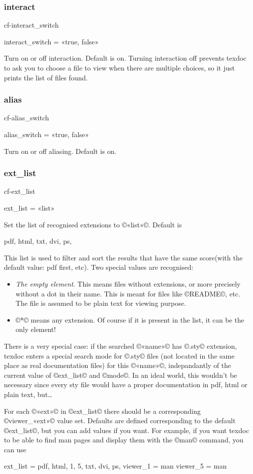 \documentclass[a4paper, oneside]{scrartcl}
\makeatletter
\newif\ifframed
\newenvironment{cmdsubsub}[2]{%
  \framedfalse \commandes\subsubsection{#1}{#2}%
  }{%
  \endcommandes}
\newenvironment{htcode}{%
  \SaveVerbatim[samepage, gobble=2]{verbmat}%
  }{%
  \endSaveVerbatim
  \par\medskip\noindent\hspace*{\parindent}%
  \BUseVerbatim{verbmat}%
  \par\medskip\@endpetrue}
\newcommand\texdoc{texdoc\xspace}
\makeatother
\begin{document}
\begin{cmdsubsub}{interact}{cf-interact_switch}
  interact_switch = «true, false»
\end{cmdsubsub}

Turn on or off interaction.  Default is on.  Turning interaction off prevents
\texdoc to ask you to choose a file to view when there are multiple choices,
so it just prints the list of files found.

\begin{cmdsubsub}{alias}{cf-alias_switch}
  alias_switch = «true, false»
\end{cmdsubsub}

Turn on or off aliasing.  Default is on.

\begin{cmdsubsub}{ext_list}{cf-ext_list}
  ext_list = «list»
\end{cmdsubsub}

Set the list of recognised extensions to ©«list»©.  Default is
\begin{htcode}
  pdf, html, txt, dvi, ps,
\end{htcode}
This list is used to filter and  sort the results that have the same
score(with the default value: pdf first, etc).  Two special values are
recognised:
\begin{itemize}
  \item \emph{The empty element}. This means files without extensions, or more
    precisely without a dot in their name.  This is meant for files like
    ©README©, etc.  The file is assumed to be plain text for viewing purpose.
  \item ©*© means any extension.  Of course if it is present in the list, it
    can be the only element!
\end{itemize}

There is a very special case: if the searched ©«name»© has ©.sty© extension,
\texdoc enters a special search mode for ©.sty© files (not located in the same
place as real documentation files) for this ©«name»©, indepandantly of the
current value of ©ext_list© and ©mode©. In an ideal world, this wouldn't be
necessary since every sty file would have a proper documentation in pdf, html
or plain text, but\dots

For each ©«ext»© in ©ext_list© there should be a corresponding ©viewer_«ext»©
value set.  Defaults are defined corresponding to the default ©ext_list©, but
you can add values if you want.  For example, if you want \texdoc to be able
to find man pages and display them with the ©man© command, you can use
\begin{htcode}
  ext_list = pdf, html, 1, 5, txt, dvi, ps,
  viewer_1 = man
  viewer_5 = man
\end{htcode}
\end{document}
